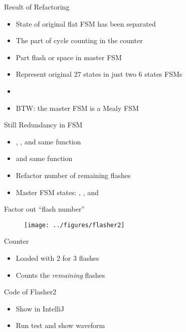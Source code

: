 \begin{frame}[fragile]{Result of Refactoring}
\begin{itemize}
\item State of original flat FSM has been separated
\item The part of cycle counting in the counter
\item Part flash or space in master FSM
\item Represent original 27 states in just two 6 states FSMs
\item 
\item BTW: the master FSM is a Mealy FSM
\end{itemize}
\end{frame}


\begin{frame}[fragile]{Still Redundancy in FSM}
\begin{itemize}
\item {}, , and  same function
\item {} and  same function
\item Refactor number of remaining flashes
\item Master FSM states: , ,
and 
\end{itemize}
\end{frame}

\begin{frame}[fragile]{Factor out ``flash number''}
\begin{figure}
  \texttt{[image: ../figures/flasher2]}
\end{figure}
\end{frame}

\begin{frame}[fragile]{Counter}
\begin{itemize}
\item Loaded with 2 for 3 flashes
\item Counts the \emph{remaining} flashes
\end{itemize}
\end{frame}

\begin{frame}[fragile]{Code of Flasher2}
\begin{itemize}
\item Show in IntelliJ
\item Run test and show waveform
\end{itemize}
\end{frame}




